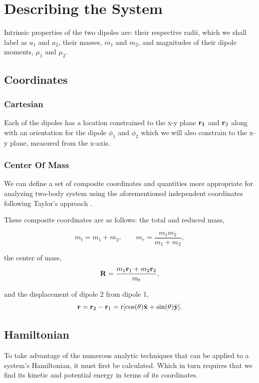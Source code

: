 \documentclass[prbg,preprint]{revtex4-1}
\newcommand{\cvec}[1]{{\rm{\bf{#1}}}}
\begin{document}
\section{Describing the System}
Intrinsic properties of the two dipoles are: their respective radii, which we shall label as $a_1$ and $a_2$, their masses, $m_1$ and $m_2$, and magnitudes of their dipole moments, $\mu_1$ and $\mu_2$.
\subsection{Coordinates}
\subsubsection{Cartesian}

Each of the dipoles has a location constrained to the x-y plane $\cvec{r_1}$ and $\cvec r_2$ along with an orientation for the dipole $\phi_1$ and $\phi_2$ which we will also constrain to the x-y plane, measured from the x-axis.
\subsubsection{Center Of Mass}
We can define a set of composite coordinates and quantities more appropriate for analyzing two-body system using the aforementioned independent coordinates following Taylor's approach \cite{taylor2005classical}. 

These composite coordinates are as follows: the total and reduced mass,

\begin{equation}
m_t = m_1+m_2,
\qquad
m_r = \frac{m_1m_2}{m_1+m_2},
\end{equation}

the center of mass,
\begin{equation}
\cvec{R} = \frac{m_1 \cvec{r}_1+m_2 \cvec{r}_2}{m_t},
\end{equation}

and the displacement of dipole 2 from dipole 1,
\begin{equation}
\cvec{r}
=  \cvec r_2-\cvec r_1 
= \textrm{r} [\cos(\theta) \hat {\cvec x}+\sin(\theta) \hat {\cvec y}].
\end{equation}


\subsection{Hamiltonian}
To take advantage of the numerous analytic techniques that can be applied to a system's Hamiltonian, it must first be calculated. Which in turn requires that we find its kinetic and potential energy in terms of its coordinates.
\end{document}
